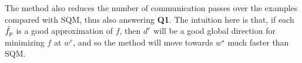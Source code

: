 \documentclass[twoside, 11pt]{article}
\begin{document}
The method also reduces the number of communication passes over the examples compared with SQM, thus also answering {\bf Q1}. The intuition here is that, if each $\hat{f}_p$ is a good approximation of $f$, then $d^r$ will be a good global direction for minimizing $f$ at $w^r$, and so the method will move towards $w^\star$ much faster than SQM.





\end{document}
